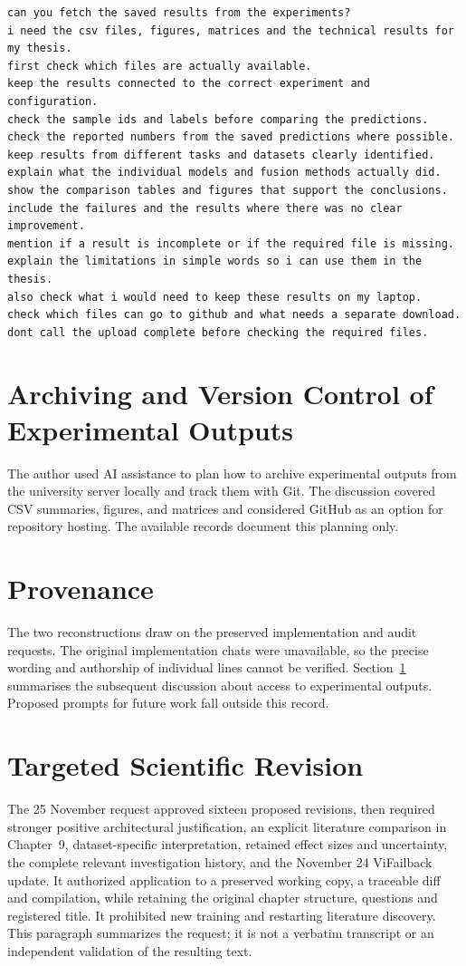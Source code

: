 \begingroup\singlespacing\footnotesize
\begin{verbatim}
can you fetch the saved results from the experiments?
i need the csv files, figures, matrices and the technical results for my thesis.
first check which files are actually available.
keep the results connected to the correct experiment and configuration.
check the sample ids and labels before comparing the predictions.
check the reported numbers from the saved predictions where possible.
keep results from different tasks and datasets clearly identified.
explain what the individual models and fusion methods actually did.
show the comparison tables and figures that support the conclusions.
include the failures and the results where there was no clear improvement.
mention if a result is incomplete or if the required file is missing.
explain the limitations in simple words so i can use them in the thesis.
also check what i would need to keep these results on my laptop.
check which files can go to github and what needs a separate download.
dont call the upload complete before checking the required files.
\end{verbatim}
\endgroup

\section{Archiving and Version Control of Experimental Outputs}
\label{sec:results-archiving}
The author used AI assistance to plan how to archive experimental outputs from the
university server locally and track them with Git. The discussion covered CSV summaries,
figures, and matrices and considered GitHub as an option for repository hosting. The
available records document this planning only.

\section{Provenance}
The two reconstructions draw on the preserved implementation and audit requests. The
original implementation chats were unavailable, so the precise wording and authorship of
individual lines cannot be verified. Section~\ref{sec:results-archiving} summarises the
subsequent discussion about access to experimental outputs. Proposed prompts for future
work fall outside this record.

\section{Targeted Scientific Revision}
The 25 November request approved sixteen proposed revisions, then required stronger
positive architectural justification, an explicit literature comparison in Chapter~9,
dataset-specific interpretation, retained effect sizes and uncertainty, the complete
relevant investigation history, and the November 24 ViFailback update. It authorized
application to a preserved working copy, a traceable diff and compilation, while
retaining the original chapter structure, questions and registered title. It prohibited
new training and restarting literature discovery. This paragraph summarizes the request;
it is not a verbatim transcript or an independent validation of the resulting text.

